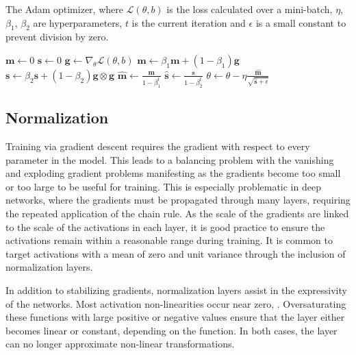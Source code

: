 \begin{algorithm}
    \caption{The Adam optimizer, where $\mathcal{L}(\theta, b)$ is the loss calculated over a mini-batch, $\eta$, $\beta_1$, $\beta_2$ are hyperparameters, $t$ is the current iteration and $\epsilon$ is a small constant to prevent division by zero.}
    \label{alg:adam}
    \begin{algorithmic}[1]
        \State $\mathbf{m} \gets 0$ 
        \State $\mathbf{s} \gets 0$ 
        \State $\mathbf{g} \gets \nabla_\theta \mathcal{L}(\theta, b)$ 
        \State $\mathbf{m} \gets \beta_1 \mathbf{m} + (1 - \beta_1) \mathbf{g}$ 
        \State $\mathbf{s} \gets \beta_2 \mathbf{s} + (1 - \beta_2) \mathbf{g} \otimes \mathbf{g}$ 
        \State $\hat{\mathbf{m}} \gets \frac{\mathbf{m}}{1 - \beta_1^t}$ 
        \State $\hat{\mathbf{s}} \gets \frac{\mathbf{s}}{1 - \beta_2^t}$ 
        \State $\theta \gets \theta - \eta \frac{\hat{\mathbf{m}}}{\sqrt{\hat{\mathbf{s}} + \epsilon}}$ 
        \EndFor
    \end{algorithmic}
\end{algorithm}

\subsection{Normalization}

Training via gradient descent requires the gradient with respect to every parameter in the model.
This leads to a balancing problem with the vanishing and exploding gradient problems manifesting as the gradients become too small or too large to be useful for training.
This is especially problematic in deep networks, where the gradients must be propagated through many layers, requiring the repeated application of the chain rule.
As the scale of the gradients are linked to the scale of the activations in each layer, it is good practice to ensure the activations remain within a reasonable range during training.
It is common to target activations with a mean of zero and unit variance through the inclusion of normalization layers.

In addition to stabilizing gradients, normalization layers assist in the expressivity of the networks.
Most activation non-linearities occur near zero, .
Oversaturating these functions with large positive or negative values ensure that the layer either becomes linear or constant, depending on the function.
In both cases, the layer can no longer approximate non-linear transformations.

